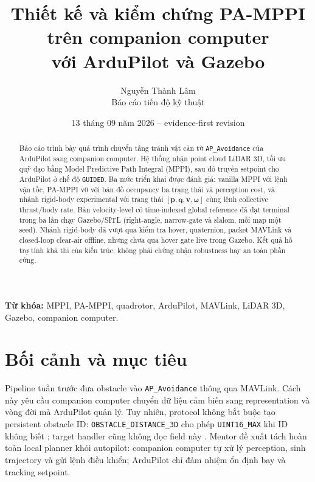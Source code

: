 \documentclass[11pt,a4paper]{article}
\title{\vspace{-1.5em}\textbf{Thiết kế và kiểm chứng PA-MPPI trên companion computer\vspace{0.2em}\\
với ArduPilot và Gazebo}}
\author{Nguyễn Thành Lâm\\[0.3em]
\small Báo cáo tiến độ kỹ thuật}
\date{13 tháng 09 năm 2026 -- evidence-first revision}
\newcommand{\code}[1]{\texttt{#1}}
\newcommand{\vect}[1]{\bm{#1}}
\begin{document}
\maketitle
\thispagestyle{empty}

\begin{abstract}
Báo cáo trình bày quá trình chuyển tầng tránh vật cản từ
\code{AP\_Avoidance} của ArduPilot sang companion computer. Hệ thống nhận
point cloud LiDAR 3D, tối ưu quỹ đạo bằng Model Predictive Path Integral
(MPPI), sau đó truyền setpoint cho ArduPilot ở chế độ \code{GUIDED}. Ba mức
triển khai được đánh giá: vanilla MPPI với lệnh vận tốc, PA-MPPI v0 với bản đồ
occupancy ba trạng thái và perception cost, và nhánh rigid-body experimental
với trạng thái $[\vect p,\vect q,\vect v,\vect\omega]$ cùng lệnh collective
thrust/body rate. Bản velocity-level có time-indexed global reference đã đạt
terminal trong ba lần chạy Gazebo/SITL (right-angle, narrow-gate và slalom,
mỗi map một seed). Nhánh rigid-body đã vượt qua kiểm tra hover, quaternion,
packet MAVLink và closed-loop clear-air offline, nhưng chưa qua hover gate live
trong Gazebo. Kết quả hỗ trợ tính khả thi của kiến trúc, không phải chứng nhận
robustness hay an toàn phần cứng.
\end{abstract}

\noindent\textbf{Từ khóa:} MPPI, PA-MPPI, quadrotor, ArduPilot, MAVLink,
LiDAR 3D, Gazebo, companion computer.

\vspace{0.8em}
\noindent{}

\clearpage
\begingroup
\small
\tableofcontents
\endgroup
\clearpage

\section{Bối cảnh và mục tiêu}

Pipeline tuần trước đưa obstacle vào \code{AP\_Avoidance} thông qua MAVLink.
Cách này yêu cầu companion computer chuyển dữ liệu cảm biến sang representation
và vòng đời mà ArduPilot quản lý. Tuy nhiên, protocol không bắt buộc tạo
persistent obstacle ID: \code{OBSTACLE\_DISTANCE\_3D} cho phép
\code{UINT16\_MAX} khi ID không biết \cite{mavlinkArdupilotmega2026}; target
handler cũng không đọc field này \cite{ardupilotSourceF808}. Mentor đề xuất tách
hoàn toàn local planner khỏi autopilot: companion computer tự xử lý perception,
sinh trajectory và gửi lệnh điều khiển; ArduPilot chỉ đảm nhiệm ổn định bay và
tracking setpoint.
\end{document}
